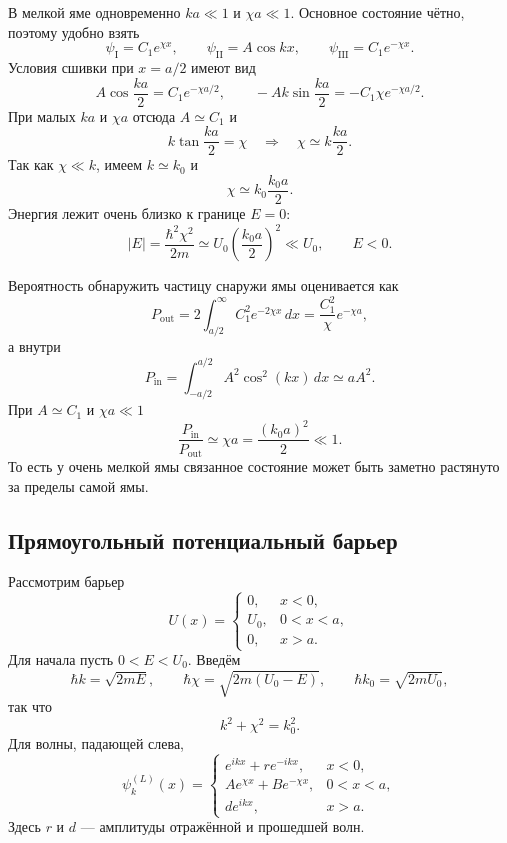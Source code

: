 \documentclass[12pt,a4paper]{article}
\begin{document}
В мелкой яме одновременно $ka\ll1$ и $\chi a\ll1$. Основное состояние
чётно, поэтому удобно взять
\[
    \psi_{\mathrm I}=C_1e^{\chi x},
    \qquad
    \psi_{\mathrm{II}}=A\cos kx,
    \qquad
    \psi_{\mathrm{III}}=C_1e^{-\chi x}.
\]
Условия сшивки при $x=a/2$ имеют вид
\[
    A\cos\frac{ka}{2}=C_1e^{-\chi a/2},
    \qquad
    -Ak\sin\frac{ka}{2}=-C_1\chi e^{-\chi a/2}.
\]
При малых $ka$ и $\chi a$ отсюда $A\simeq C_1$ и
\[
    k\tan\frac{ka}{2}=\chi
    \quad\Rightarrow\quad
    \chi\simeq k\frac{ka}{2}.
\]
Так как $\chi\ll k$, имеем $k\simeq k_0$ и
\[
    \chi\simeq k_0\frac{k_0a}{2}.
\]
Энергия лежит очень близко к границе $E=0$:
\[
    |E|=\frac{\hbar^2\chi^2}{2m}
    \simeq U_0\left(\frac{k_0a}{2}\right)^2\ll U_0,
    \qquad E<0.
\]

Вероятность обнаружить частицу снаружи ямы оценивается как
\[
    P_{\mathrm{out}}
    =2\int_{a/2}^{\infty}C_1^2e^{-2\chi x}\,dx
    =\frac{C_1^2}{\chi}e^{-\chi a},
\]
а внутри
\[
    P_{\mathrm{in}}
    =\int_{-a/2}^{a/2}A^2\cos^2(kx)\,dx
    \simeq aA^2.
\]
При $A\simeq C_1$ и $\chi a\ll1$
\[
    \frac{P_{\mathrm{in}}}{P_{\mathrm{out}}}
    \simeq\chi a
    =\frac{(k_0a)^2}{2}\ll1.
\]
То есть у очень мелкой ямы связанное состояние может быть заметно
растянуто за пределы самой ямы.

\subsection{Прямоугольный потенциальный барьер}

Рассмотрим барьер
\[
    U(x)=
    \begin{cases}
        0, & x<0,\\
        U_0, & 0<x<a,\\
        0, & x>a.
    \end{cases}
\]
Для начала пусть $0<E<U_0$. Введём
\[
    \hbar k=\sqrt{2mE},
    \qquad
    \hbar\chi=\sqrt{2m(U_0-E)},
    \qquad
    \hbar k_0=\sqrt{2mU_0},
\]
так что
\[
    k^2+\chi^2=k_0^2.
\]
Для волны, падающей слева,
\[
    \psi_k^{(L)}(x)=
    \begin{cases}
        e^{ikx}+r e^{-ikx}, & x<0,\\
        Ae^{\chi x}+Be^{-\chi x}, & 0<x<a,\\
        de^{ikx}, & x>a.
    \end{cases}
\]
Здесь $r$ и $d$ --- амплитуды отражённой и прошедшей волн.
\end{document}
